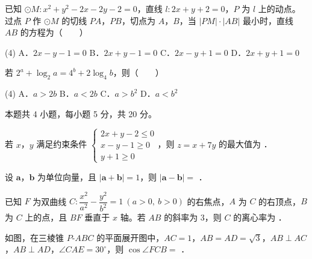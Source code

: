 \begin{question}
已知 $\odot M:x^{2}+y^{2}-2x-2y-2=0$，直线 $l:2x+y+2=0$，$P$ 为 $l$ 上的动点。过点 $P$ 作 $\odot M$ 的切线 $PA$，$PB$，切点为 $A$，$B$，当 $|PM|\cdot|AB|$ 最小时，直线 $AB$ 的方程为\mbox{（　　）}

\begin{gkopts}(4)
\task A．$2x-y-1=0$
\task B．$2x+y-1=0$
\task C．$2x-y+1=0$
\task D．$2x+y+1=0$
\end{gkopts}

\end{question}
\begin{question}
若 $2^{a}+\log_2 a=4^{b}+2\log_4 b$，则\mbox{（　　）}

\begin{gkopts}(4)
\task A．$a>2b$
\task B．$a<2b$
\task C．$a>b^{2}$
\task D．$a<b^{2}$
\end{gkopts}

\par\medskip

\end{question}

\begin{gktip}
本题共 4 小题，每小题 5 分，共 20 分。
\end{gktip}

\begin{question}
若 $x$，$y$ 满足约束条件 $\begin{cases}2x+y-2\le0\\ x-y-1\ge0\\ y+1\ge0\end{cases}$，则 $z=x+7y$ 的最大值为 \gkblank{}．

\end{question}
\begin{question}
设 $\boldsymbol a$，$\boldsymbol b$ 为单位向量，且 $|\boldsymbol a+\boldsymbol b|=1$，则 $|\boldsymbol a-\boldsymbol b|=$ \gkblank{}．

\end{question}
\begin{question}
已知 $F$ 为双曲线 $C:\dfrac{x^{2}}{a^{2}}-\dfrac{y^{2}}{b^{2}}=1\ (a>0,\ b>0)$ 的右焦点，$A$ 为 $C$ 的右顶点，$B$ 为 $C$ 上的点，且 $BF$ 垂直于 $x$ 轴。若 $AB$ 的斜率为 $3$，则 $C$ 的离心率为 \gkblank{}．

\Needspace{0.4\textheight}
\end{question}
\begin{question}
如图，在三棱锥 $P\text{-}ABC$ 的平面展开图中，$AC=1$，$AB=AD=\sqrt3$，$AB\perp AC$，$AB\perp AD$，$\angle CAE=30^\circ$，则 $\cos\angle FCB=$ \gkblank{}．
\nopagebreak[4]
\begin{center}\end{center}
\nopagebreak[4]
\par\medskip

\end{question}


